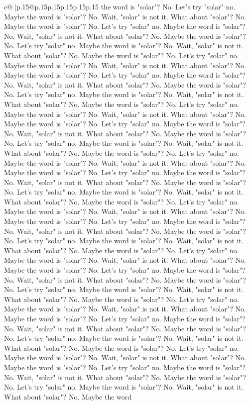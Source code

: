 \documentclass{article}
\begin{document}
{\begin{supertabular}{c@{$\;$}|p{.15\linewidth}@{}p{.15\linewidth}p{.15\linewidth}p{.15\linewidth}p{.15\linewidth}p{.15\linewidth}}
{{{the word is "solar"? No. Let's try "solar" no. Maybe the word is "solar"? No. Wait, "solar" is not it. What about "solar"? No. Maybe the word is "solar"? No. Let's try "solar" no. Maybe the word is "solar"? No. Wait, "solar" is not it. What about "solar"? No. Maybe the word is "solar"? No. Let's try "solar" no. Maybe the word is "solar"? No. Wait, "solar" is not it. What about "solar"? No. Maybe the word is "solar"? No. Let's try "solar" no. Maybe the word is "solar"? No. Wait, "solar" is not it. What about "solar"? No. Maybe the word is "solar"? No. Let's try "solar" no. Maybe the word is "solar"? No. Wait, "solar" is not it. What about "solar"? No. Maybe the word is "solar"? No. Let's try "solar" no. Maybe the word is "solar"? No. Wait, "solar" is not it. What about "solar"? No. Maybe the word is "solar"? No. Let's try "solar" no. Maybe the word is "solar"? No. Wait, "solar" is not it. What about "solar"? No. Maybe the word is "solar"? No. Let's try "solar" no. Maybe the word is "solar"? No. Wait, "solar" is not it. What about "solar"? No. Maybe the word is "solar"? No. Let's try "solar" no. Maybe the word is "solar"? No. Wait, "solar" is not it. What about "solar"? No. Maybe the word is "solar"? No. Let's try "solar" no. Maybe the word is "solar"? No. Wait, "solar" is not it. What about "solar"? No. Maybe the word is "solar"? No. Let's try "solar" no. Maybe the word is "solar"? No. Wait, "solar" is not it. What about "solar"? No. Maybe the word is "solar"? No. Let's try "solar" no. Maybe the word is "solar"? No. Wait, "solar" is not it. What about "solar"? No. Maybe the word is "solar"? No. Let's try "solar" no. Maybe the word is "solar"? No. Wait, "solar" is not it. What about "solar"? No. Maybe the word is "solar"? No. Let's try "solar" no. Maybe the word is "solar"? No. Wait, "solar" is not it. What about "solar"? No. Maybe the word is "solar"? No. Let's try "solar" no. Maybe the word is "solar"? No. Wait, "solar" is not it. What about "solar"? No. Maybe the word is "solar"? No. Let's try "solar" no. Maybe the word is "solar"? No. Wait, "solar" is not it. What about "solar"? No. Maybe the word is "solar"? No. Let's try "solar" no. Maybe the word is "solar"? No. Wait, "solar" is not it. What about "solar"? No. Maybe the word is "solar"? No. Let's try "solar" no. Maybe the word is "solar"? No. Wait, "solar" is not it. What about "solar"? No. Maybe the word is "solar"? No. Let's try "solar" no. Maybe the word is "solar"? No. Wait, "solar" is not it. What about "solar"? No. Maybe the word is "solar"? No. Let's try "solar" no. Maybe the word is "solar"? No. Wait, "solar" is not it. What about "solar"? No. Maybe the word is "solar"? No. Let's try "solar" no. Maybe the word is "solar"? No. Wait, "solar" is not it. What about "solar"? No. Maybe the word is "solar"? No. Let's try "solar" no. Maybe the word is "solar"? No. Wait, "solar" is not it. What about "solar"? No. Maybe the word is "solar"? No. Let's try "solar" no. Maybe the word is "solar"? No. Wait, "solar" is not it. What about "solar"? No. Maybe the word is "solar"? No. Let's try "solar" no. Maybe the word is "solar"? No. Wait, "solar" is not it. What about "solar"? No. Maybe the word }}}
\end{supertabular}}
\end{document}
